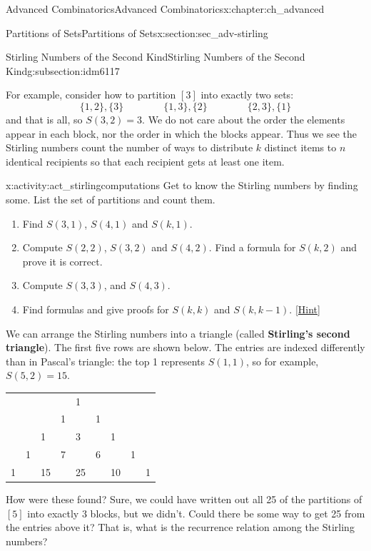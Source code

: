 \documentclass[oneside,10pt,]{book}
\newcommand{\terminology}[1]{\textbf{#1}}
\numberwithin{equation}{chapter}
\begin{document}
\begin{chapterptx}{Advanced Combinatorics}{}{Advanced Combinatorics}{}{}{x:chapter:ch_advanced}
\begin{sectionptx}{Partitions of Sets}{}{Partitions of Sets}{}{}{x:section:sec_adv-stirling}
\begin{subsectionptx}{Stirling Numbers of the Second Kind}{}{Stirling Numbers of the Second Kind}{}{}{g:subsection:idm6117}
\par
For example, consider how to partition \([3]\) into exactly two sets:%
\begin{equation*}
\{1,2\}, \{3\} \qquad \qquad \{1,3\},\{2\} \qquad \qquad \{2,3\},\{1\}
\end{equation*}
and that is all, so \(S(3,2) = 3\).  We do not care about the order the elements appear in each block, nor the order in which the blocks appear.  Thus we see the Stirling numbers count the number of ways to distribute \(k\) distinct items to \(n\) identical recipients so that each recipient gets at least one item.%
\begin{activity}{}{x:activity:act_stirlingcomputations}%
Get to know the Stirling numbers by finding some.  List the set of partitions and count them.%
\begin{enumerate}[font=\bfseries,label=(\alph*),ref=\alph*]
\item{}Find \(S(3,1)\), \(S(4,1)\) and \(S(k,1)\).%
\item{}Compute \(S(2,2)\), \(S(3,2)\) and \(S(4,2)\).  Find a formula for \(S(k,2)\) and prove it is correct.%
\item{}Compute \(S(3,3)\), and \(S(4,3)\).%
\item{}Find formulas and give proofs for \(S(k,k)\) and \(S(k,k - 1)\).%
\space\hspace*{0pt}\hfill{\tiny\hyperlink{g:hint:idm6168-back}{[Hint]}}\end{enumerate}
\end{activity}
We can arrange the Stirling numbers into a triangle (called \terminology{Stirling's second triangle}).  The first five rows are shown below.  The entries are indexed differently than in Pascal's triangle: the top 1 represents \(S(1,1)\), so for example, \(S(5,2) = 15\).%
\begin{sidebyside}{1}{0.25}{0.25}{0}%
\begin{sbspanel}{0.5}%
{\centering%
\begin{tabular}{lllllllll}
&&&&1&&&&\tabularnewline[0pt]
&&&1&&1&&&\tabularnewline[0pt]
&&1&&3&&1&&\tabularnewline[0pt]
&1&&7&&6&&1&\tabularnewline[0pt]
1&&15&&25&&10&&1
\end{tabular}
\par}
\end{sbspanel}%
\end{sidebyside}%
\par
How were these found?  Sure, we could have written out all 25 of the partitions of \([5]\) into exactly \(3\) blocks, but we didn't.  Could there be some way to get 25 from the entries above it?  That is, what is the recurrence relation among the Stirling numbers?%

\end{subsectionptx}
\end{sectionptx}
\end{chapterptx}
\end{document}
